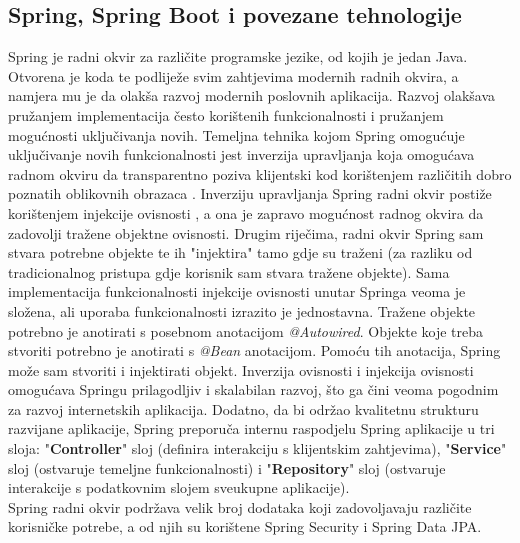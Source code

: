 \documentclass[times, utf8, zavrsni]{fer}
\begin{document}
			\subsection{Spring, Spring Boot i povezane tehnologije}
			Spring je radni okvir za različite programske jezike, od kojih je jedan Java. Otvorena je koda te podliježe svim zahtjevima modernih radnih okvira, a namjera mu je da olakša razvoj modernih poslovnih aplikacija. Razvoj olakšava pružanjem implementacija često korištenih funkcionalnosti i pružanjem mogućnosti uključivanja novih. Temeljna tehnika kojom Spring omogućuje uključivanje novih funkcionalnosti jest inverzija upravljanja  koja omogućava radnom okviru da transparentno poziva klijentski kod korištenjem različitih dobro poznatih oblikovnih obrazaca . Inverziju upravljanja Spring radni okvir postiže korištenjem injekcije ovisnosti , a ona je zapravo mogućnost radnog okvira da zadovolji tražene objektne ovisnosti. Drugim riječima, radni okvir Spring sam stvara potrebne objekte te ih "injektira" tamo gdje su traženi (za razliku od tradicionalnog pristupa gdje korisnik sam stvara tražene objekte). Sama implementacija funkcionalnosti injekcije ovisnosti unutar Springa veoma je složena, ali uporaba funkcionalnosti izrazito je jednostavna. Tražene objekte potrebno je anotirati s posebnom anotacijom \textit{@Autowired}. Objekte koje treba stvoriti potrebno je anotirati s \textit{@Bean} anotacijom. Pomoću tih anotacija, Spring može sam stvoriti i injektirati objekt. Inverzija ovisnosti i injekcija ovisnosti omogućava Springu prilagodljiv i skalabilan razvoj, što ga čini veoma pogodnim za razvoj internetskih aplikacija. Dodatno, da bi održao kvalitetnu strukturu razvijane aplikacije, Spring preporuča internu raspodjelu Spring aplikacije u tri sloja: "\textbf{Controller}" sloj (definira interakciju s klijentskim zahtjevima), "\textbf{Service}" sloj (ostvaruje temeljne funkcionalnosti) i "\textbf{Repository}" sloj (ostvaruje interakcije s podatkovnim slojem sveukupne aplikacije).\\
			Spring radni okvir podržava velik broj dodataka koji zadovoljavaju različite korisničke potrebe, a od njih su korištene Spring Security i Spring Data JPA.
\end{document}
